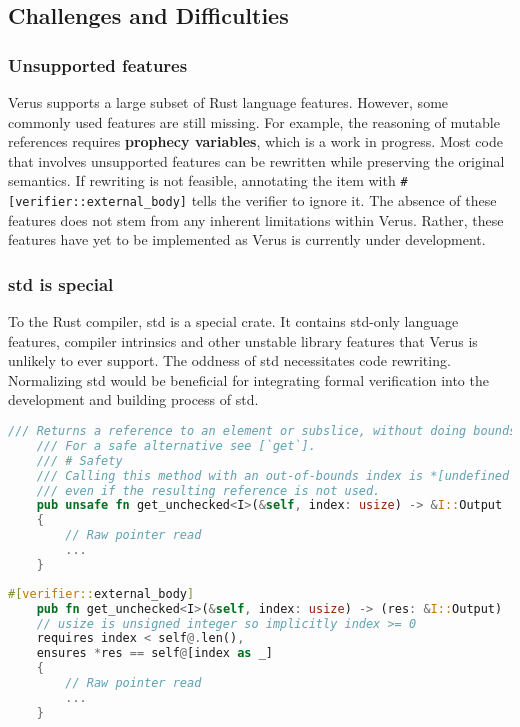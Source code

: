 \documentclass[conference]{IEEEtran}
\begin{document}
\subsection{Challenges and Difficulties}
\subsubsection{Unsupported features} 
Verus supports a large subset of Rust language features. However, some commonly used features are still missing. For example, the reasoning of mutable references requires \textbf{prophecy variables}\cite{Prophecy}, which is a work in progress. Most code that involves unsupported features can be rewritten while preserving the original semantics. If rewriting is not feasible, annotating the item with \texttt{\#[verifier::external\_body]} tells the verifier to ignore it. The absence of these features does not stem from any inherent limitations within Verus. Rather, these features have yet to be implemented as Verus is currently under development.  

\subsubsection{std is special}
To the Rust compiler, std is a special crate. It contains std-only language features, compiler intrinsics and other unstable library features that Verus is unlikely to ever support. The oddness of std necessitates code rewriting. Normalizing std would be beneficial for integrating formal verification into the development and building process of std.     

\begin{lstlisting}[float,language=Rust,style=colouredRust, caption={a simplified example of the safety condition of an unsafe public function in std}, label = {1}]
     /// Returns a reference to an element or subslice, without doing bounds checking.
    /// For a safe alternative see [`get`].
    /// # Safety
    /// Calling this method with an out-of-bounds index is *[undefined behavior]*
    /// even if the resulting reference is not used.
    pub unsafe fn get_unchecked<I>(&self, index: usize) -> &I::Output
    {
        // Raw pointer read  
        ...
    }
\end{lstlisting}

\begin{lstlisting}[float,language=Rust,style=colouredRust, caption={a simplified example of converting an unsafe function into a conditionally safe function. We do not need the \texttt{unsafe} keyword in the function signature if the caller is also verified. The \texttt{external\_body} annotation makes the verifier ignore the function body. The safety condition in the comment is also replaced with a precondition. The \texttt{@} operator is a syntactic sugar that returns the abstract representation of the operand.}, label = {2}]
    #[verifier::external_body]
    pub fn get_unchecked<I>(&self, index: usize) -> (res: &I::Output)
    // usize is unsigned integer so implicitly index >= 0
    requires index < self@.len(),
    ensures *res == self@[index as _]
    {
        // Raw pointer read  
        ...
    }
\end{lstlisting}
\end{document}
